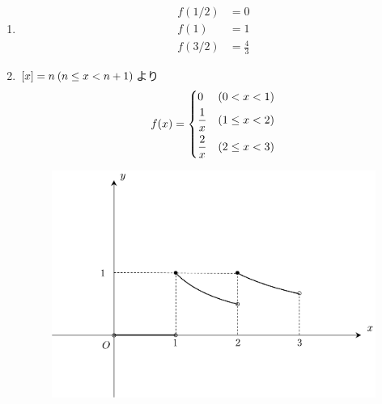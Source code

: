 \begin{ans*}
  ${}$
  \begin{enumerate}[label=(\arabic*)]
    \item
    \begin{align}
      f(1/2) &= 0 \\
      f(1) &= 1 \\
      f(3/2) &= \frac{4}{3}
    \end{align}
    \item $\left[ x \right]=n\:(n\leq x < n+1)$より
    \begin{gather}
      f(x) =
      \begin{dcases}
        0 & (0 < x < 1) \\
        \frac{1}{x} & (1\leq x < 2) \\
        \frac{2}{x} & (2\leq x < 3)
      \end{dcases}
    \end{gather}

    \begin{figure}[H]\centering
      \includegraphics[width=.75\linewidth]{./src/fig/Basic/B_2021_spring_f.png}
    \end{figure}
  \end{enumerate}
\end{ans*}

